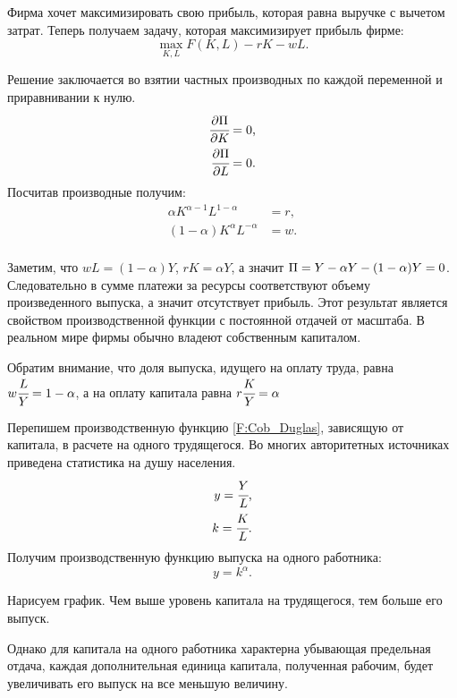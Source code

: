 Фирма хочет максимизировать свою прибыль, которая равна выручке с вычетом затрат.
Теперь получаем задачу, которая максимизирует прибыль фирме:
\begin{equation}
	\max\limits_{K, L} F(K,L) - rK - wL\text{.}
\end{equation}

Решение заключается во взятии частных производных по каждой переменной и приравнивании к нулю.
\begin{align*}
	\cfrac{\partial \Pi}{\partial K} &= 0\text{,} \\
	\cfrac{\partial \Pi}{\partial L} &= 0\text{.}
\end{align*}
Посчитав производные получим:
\begin{align*}
	\alpha K^{\alpha - 1} L^{1-\alpha} &= r\text{,}\\
	(1 - \alpha) K^{\alpha} L^{-\alpha} &= w\text{.}\\
\end{align*}

Заметим, что $wL = (1-\alpha)Y$, $rK = \alpha Y$, а значит $\Pi=Y - \alpha Y - (1\hm{-} \alpha)Y = 0$.
Следовательно в сумме платежи за ресурсы соответствуют объему произведенного выпуска, а значит отсутствует прибыль.
Этот результат является свойством производственной функции с постоянной отдачей от масштаба.
В реальном мире фирмы обычно владеют собственным капиталом.

Обратим внимание, что доля выпуска, идущего на оплату труда, равна $w\cfrac{L}{Y} = 1 - \alpha$, а на оплату капитала равна $r\cfrac{K}{Y} = \alpha$

Перепишем производственную функцию \ref{F:Cob_Duglas}, зависящую от капитала, в расчете на одного трудящегося.
Во многих авторитетных источниках приведена статистика на душу населения.
\begin{align*}
y = \cfrac{Y}{L}\text{,}\\
k = \cfrac{K}{L}\text{.}
\end{align*}
Получим производственную функцию выпуска на одного работника:
\begin{equation}
	y = k^{\alpha}\text{.}
\label{F:proiz_per_worker}
\end{equation}

Нарисуем график.
Чем выше уровень капитала на трудящегося, тем больше его выпуск.

\begin{center}
\end{center}
Однако для капитала на одного работника характерна убывающая предельная отдача, каждая дополнительная единица капитала, полученная рабочим, будет увеличивать его выпуск на все меньшую величину.

